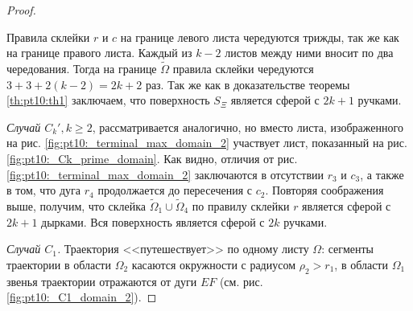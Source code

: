 \begin{proof}
\begin{figure}[!htb]
    \label{fig:pt10:_big_domain_transformed_2}
\end{figure}

Правила склейки $r$ и $c$ на границе левого листа чередуются трижды, так же как на границе правого листа. Каждый из $k-2$ листов между ними вносит по два чередования. Тогда на границе $\widetilde{\Omega}$ правила склейки чередуются $3+3+2(k-2) = 2k+2$ раз. 
Так же как в доказательстве теоремы \ref{th:pt10:th1} заключаем, что  поверхность $S_\Xi$ является сферой с $2k+1$ ручками.

\textit{Случай $C_k', k\geq 2$}, рассматривается аналогично, но вместо листа, изображенного на рис. \ref{fig:pt10:_terminal_max_domain_2} участвует лист, показанный на рис. \ref{fig:pt10:_Ck_prime_domain}. Как видно, отличия от рис. \ref{fig:pt10:_terminal_max_domain_2} заключаются в отсутствии $r_3$ и $c_3$, а также в том, что дуга $r_4$ продолжается до пересечения с  $c_2$. Повторяя соображения выше, получим, что склейка $\widetilde{\Omega}_1 \cup \widetilde{\Omega}_4$ по правилу склейки $r$ является сферой с $2k + 1$ дырками. Вся поверхность является сферой с $2k$ ручками.

\textit{Случай $C_1$.} Траектория <<путешествует>> по одному листу $\Omega$: сегменты траектории в области $\Omega_2$ касаются окружности с радиусом $\rho_2 > r_1$, в области $\Omega_1$ звенья траектории отражаются от дуги $EF$ (см. рис. \ref{fig:pt10:_C1_domain_2}).


\end{proof}
